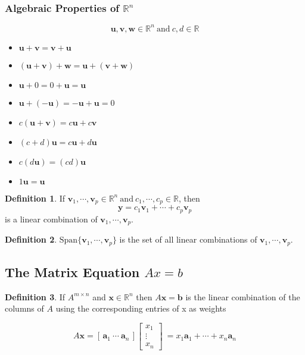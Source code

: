 \documentclass{article}
\renewcommand{\vec}[1]{\textbf{#1}}
\theoremstyle{definition}
\newtheorem{definition}{Definition}[section]
\theoremstyle{remark}
\theoremstyle{remark}
\theoremstyle{remark}
\newtheorem*{it follows}{It follows}
\begin{document}
\subsubsection{Algebraic Properties of $\mathbb{R}^n$}

\begin{equation}
  \vec{u}, \vec{v}, \vec{w} \in \mathbb{R}^n\ \text{and}\ c, d \in \mathbb{R}
\end{equation}

\begin{itemize}
  \item $\vec{u} + \vec{v} = \vec{v} + \vec{u}$
  \item $(\vec{u} + \vec{v}) + \vec{w} = \vec{u} + (\vec{v} + \vec{w})$
  \item $\vec{u} + 0 = 0 + \vec{u} = \vec{u}$
  \item $\vec{u} + (-\vec{u}) = -\vec{u} + \vec{u} = 0$
  \item $c(\vec{u} + \vec{v}) = c\vec{u} + c\vec{v}$
  \item $(c + d)\vec{u} = c\vec{u} + d\vec{u}$
  \item $c(d\vec{u}) = (cd)\vec{u}$
  \item $1\vec{u} = \vec{u}$
\end{itemize}

\begin{definition}
  If $\vec{v}_1, \cdots, \vec{v}_p \in \mathbb{R}^n\ \text{and}\ c_1, \cdots, c_p \in \mathbb{R}$, then
  $$\vec{y} = c_1 \vec{v}_1 + \cdots + c_p \vec{v}_p$$
  is a linear combination of $\vec{v}_1, \cdots, \vec{v}_p$.
\end{definition}

\begin{definition}
  $\text{Span}\{\vec{v}_1, \cdots, \vec{v}_p\}$ is the set of all linear combinations of $\vec{v}_1, \cdots, \vec{v}_p$.
\end{definition}

\subsection{The Matrix Equation $Ax = b$}

\begin{definition}
  If $A^{m \times n}$ and $\vec{x} \in \mathbb{R}^n$ then $A\vec{x}=\vec{b}$ is the linear combination of the columns of $A$ using the corresponding entries of x as weights

  \begin{equation*}
    A\vec{x} = \left[ \, \vec{a}_1\ \cdots\ \vec{a}_n  \, \right]
    \begin{bmatrix}
      x_1 \\
      \vdots  \\
      x_n
    \end{bmatrix}\
    = x_1 \vec{a}_1 + \cdots + x_n \vec{a}_n
  \end{equation*}
\end{definition}
\end{document}
